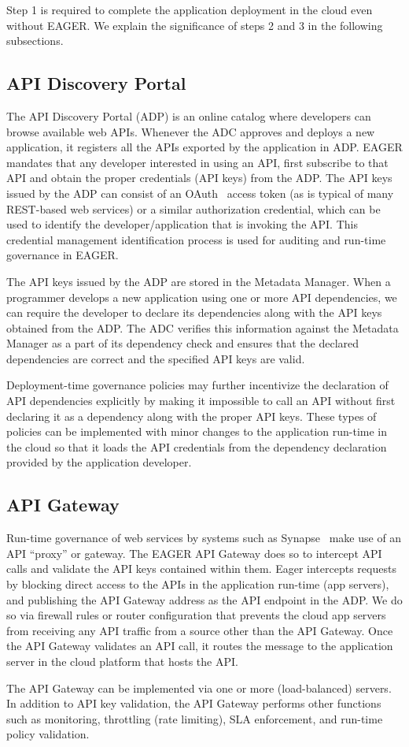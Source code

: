 Step 1 is required to complete the application deployment in the cloud even
without EAGER. We explain the significance of steps 2 and 3 in the 
following subsections.

\subsection{API Discovery Portal} 
The API Discovery Portal (ADP) is an online
catalog where developers can browse available web APIs. Whenever the ADC
approves and deploys a new application, it registers all the APIs exported by
the application in ADP.  EAGER mandates that any developer interested in using
an API, first subscribe to that API and obtain the proper credentials (API
keys) from the ADP. The API keys issued by the ADP can consist of an
OAuth~\cite{oauth2} access
token (as is typical of many REST-based web services) 
or a similar authorization credential, which can be used to identify the
developer/application that is invoking the API. This credential management
identification process is used for auditing and run-time governance in EAGER.

The API keys issued by the ADP are stored in the Metadata Manager. When a
programmer develops a new application using one or more API dependencies, we
can require the developer to declare its dependencies along with the API
keys obtained from the ADP. The ADC verifies this information against
the Metadata Manager as a part of its dependency check and ensures that the
declared dependencies are correct and the specified API keys are valid. 

Deployment-time governance policies
may further incentivize the declaration of API 
dependencies explicitly by making it 
impossible to call an API without first declaring it as a dependency along
with the proper API keys. These types of policies can be implemented
with minor changes to the
application run-time in the cloud so that it loads the API credentials from
the dependency declaration provided by the application developer.

\subsection{API Gateway} 
Run-time governance of web services by systems such as
Synapse~\cite{synapse} make use of an API ``proxy'' or gateway.
The EAGER API Gateway does so to intercept API calls and validate 
the API keys contained within them.
Eager intercepts requests by blocking direct access to the APIs in the
application run-time (app servers), and publishing the API Gateway address as
the API endpoint in the ADP. We do so via firewall rules
or router configuration that prevents the cloud app servers from receiving any
API traffic from a source other than the API Gateway. Once the API Gateway validates
an API call, it routes the message to the
application server in the cloud platform that hosts the API.

The API Gateway can be implemented via one or more (load-balanced) servers.
In addition to API key validation, the API Gateway performs other
functions such as monitoring, throttling (rate limiting), SLA
enforcement, and run-time policy validation. 

